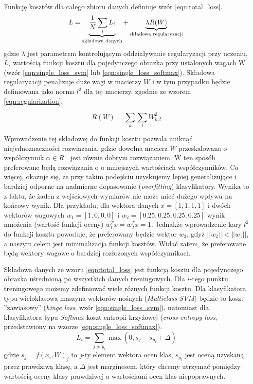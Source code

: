 Funkcję kosztów dla całego zbioru danych definiuje wzór \ref{eqn:total_loss}.
\begin{equation}\label{eqn:total_loss}
L =  \underbrace{ \frac{1}{N} \sum_i L_i }_\text{składowa danych} + \underbrace{ \lambda R(W) }_\text{składowa regularyzacji} \\\\
\end{equation}
gdzie $\lambda$ jest parametrem kontrolującym oddziaływanie regularyzacji przy uczeniu, $L_i$ wartością funkcji kosztu dla pojedynczego obrazka przy ustalonych wagach W (wzór \ref{eqn:single_loss_svm} lub \ref{eqn:single_loss_softmax}).
Składowa regularyzacji penalizuje duże wagi w macierzy $W$ i w tym przypadku będzie definiowana jako norma $l^2$ dla tej macierzy, zgodnie ze wzorem \ref{eqn:regularization}.

\begin{equation}\label{eqn:regularization}
R(W) = \sum_k\sum_l W_{k,l}^2
\end{equation}

Wprowadzenie tej składowej do funkcji kosztu pozwala uniknąć niejednoznaczności rozwiązania, gdzie dowolna macierz $W$ przeskalowana o współczynnik $\alpha \in R^+$ jest równie dobrym rozwiązaniem.
W ten sposób preferowane będą rozwiązania o o mniejszych wartościach współczynników.
Co więcej, okazuje się, że przy takim podejściu uzyskujemy lepiej generalizujące i bardziej odporne na nadmierne dopasowanie (\textit{overfitting}) klasyfikatory.
Wynika to z faktu, że żaden z wejściowych wymiarów nie może mieć dużego wpływu na końcowy wynik.
Dla przykładu, dla wektora danych $x = [1,1,1,1]$ i dwóch wektorów wagowych $w_1 = [1,0,0,0]$ i $w_2 = [0.25,0.25,0.25,0.25]$ wynik mnożenia (wartość funkcji oceny) $w_1^Tx = w_2^Tx = 1$.
Jednakże wprowadzenie kary $l^2$ do funkcji kosztu powoduje, że preferowany będzie wektor $w_2$, gdyż $||w_2|| < ||w_1||$, a naszym celem jest minimalizacja funkcji kosztów.
Widać zatem, że preferowane będą wektory wagowe o bardziej rozłożonych współczynnikach.

Składowa danych ze wzoru \ref{eqn:total_loss} jest funkcją kosztu dla pojedynczego obrazka uśrednioną po wszystkich danych treningowych.
Dla $i$-tego punktu treningowego możemy zdefiniować wiele różnych funkcji kosztu.
Dla klasyfikatora typu wieloklasowa maszyna wektorów nośnych (\textit{Multiclass SVM}) będzie to koszt ''zawiasowy'' (\textit{hinge loss}, wzór \ref{eqn:single_loss_svm}), natomiast dla klasyfikatora typu \textit{Softmax} koszt entropii krzyżowej (\textit{cross-entropy loss}, przedstawiony na wzorze \ref{eqn:single_loss_softmax}).
\begin{equation}\label{eqn:single_loss_svm}
L_i = \sum_{j\neq y_i} \max(0, s_j - s_{y_i} + \Delta)
\end{equation}
gdzie $s_j = f(x_i, W)_j$ to $j$-ty element wektora ocen klas, $s_{y_i}$ jest oceną uzyskaną przez prawdziwą klasę, a $\Delta$ jest marginesem, który chcemy utrzymać pomiędzy wartością oceny klasy prawdziwej a wartościami ocen klas niepoprawnych.

